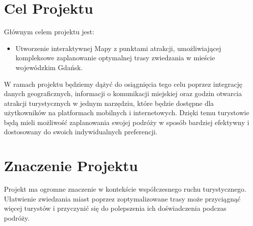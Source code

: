 \documentclass{report}
\begin{document}
	\begin{center}
	\end{center}

	\section{Cel Projektu}
	
	Głównym celem projektu jest:
	
	\begin{itemize}
		\item Utworzenie interaktywnej Mapy z punktami atrakcji, umożliwiającej kompleksowe zaplanowanie optymalnej trasy zwiedzania w mieście wojewódzkim Gdańsk.
	\end{itemize}
	
	W ramach projektu będziemy dążyć do osiągnięcia tego celu poprzez integrację danych geograficznych, informacji o komunikacji miejskiej oraz godzin otwarcia atrakcji turystycznych w jednym narzędziu, które będzie dostępne dla użytkowników na platformach mobilnych i internetowych. Dzięki temu turystowie będą mieli możliwość zaplanowania swojej podróży w sposób bardziej efektywny i dostosowany do swoich indywidualnych preferencji.
	
	\section{Znaczenie Projektu}
	
	Projekt ma ogromne znaczenie w kontekście współczesnego ruchu turystycznego. Ułatwienie zwiedzania miast poprzez zoptymalizowane trasy może przyciągnąć więcej turystów i przyczynić się do polepszenia ich doświadczenia podczas podróży. 
	
\end{document}
